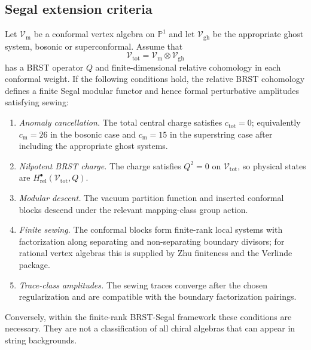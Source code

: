 \subsection{Segal extension criteria}

\begin{theorem}\label{thm:classification-extendable}
Let $\mathcal{V}_{\mathrm{m}}$ be a conformal vertex algebra on
$\mathbb{P}^1$ and let $\mathcal{V}_{\mathrm{gh}}$ be the appropriate
ghost system, bosonic or superconformal. Assume that
\[
\mathcal{V}_{\mathrm{tot}}
=\mathcal{V}_{\mathrm{m}}\otimes\mathcal{V}_{\mathrm{gh}}
\]
has a BRST operator $Q$ and finite-dimensional relative cohomology in
each conformal weight. If the following conditions hold, the relative
BRST cohomology defines a finite Segal modular functor and hence
formal perturbative amplitudes satisfying sewing:
\begin{enumerate}
\item \emph{Anomaly cancellation.} The total central charge satisfies
$c_{\mathrm{tot}}=0$; equivalently
$c_{\mathrm{m}}=26$ in the bosonic case and $c_{\mathrm{m}}=15$ in the
superstring case after including the appropriate ghost systems.
\item \emph{Nilpotent BRST charge.} The charge satisfies
$Q^2=0$ on $\mathcal{V}_{\mathrm{tot}}$, so physical states are
$H^\bullet_{\mathrm{rel}}(\mathcal{V}_{\mathrm{tot}},Q)$.
\item \emph{Modular descent.} The vacuum partition function and
inserted conformal blocks descend under the relevant mapping-class
group action.
\item \emph{Finite sewing.} The conformal blocks form finite-rank
local systems with factorization along separating and
non-separating boundary divisors; for rational vertex algebras this is
supplied by Zhu finiteness and the Verlinde package.
\item \emph{Trace-class amplitudes.} The sewing traces converge after
the chosen regularization and are compatible with the boundary
factorization pairings.
\end{enumerate}
Conversely, within the finite-rank BRST-Segal framework these
conditions are necessary. They are not a classification of all chiral
algebras that can appear in string backgrounds.
\end{theorem}

